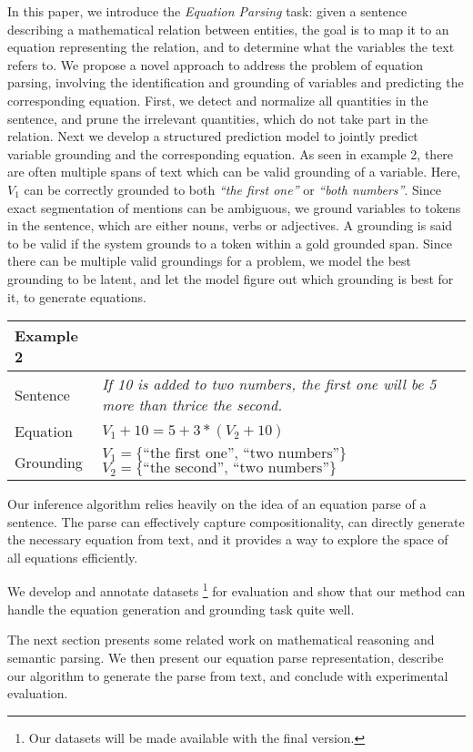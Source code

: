   In this paper, we introduce the {\em Equation Parsing} task: given a
  sentence describing a mathematical relation between entities, the
  goal is to map it to an equation representing the relation, and to
  determine what the variables the text refers to. We propose a novel
  approach to address the problem of equation parsing, involving the
  identification and grounding of variables and predicting the
  corresponding equation. First, we detect and normalize all
  quantities in the sentence, and prune the irrelevant quantities,
  which do not take part in the relation. Next we develop a structured
  prediction model to jointly predict variable grounding and the
  corresponding equation.  As seen in example 2, there are often
  multiple spans of text which can be valid grounding of a
  variable. Here, $V_1$ can be correctly grounded to both {\em``the
  first one''} or {\em``both numbers''}. Since exact segmentation of
  mentions can be ambiguous, we ground variables to tokens in the
  sentence, which are either nouns, verbs or adjectives. A grounding
  is said to be valid if the system grounds to a token within a gold
  grounded span.  Since there can be multiple valid groundings for a
  problem, we model the best grounding to be latent, and let the model
  figure out which grounding is best for it, to generate equations.
  
  
  \setlength{\tabcolsep}{6pt} 
  \begin{table} 
         \centering 
         \small 
         \begin{tabular}{|lp{5cm}|} \hline
         Example 2 & \\ \hline 
         Sentence & {\em If 10 is added to two numbers,
         the first one will be 5 more than thrice the second.} \\ \hline
         Equation & $V_1+10=5+3*(V_2+10)$\\ \hline 
         Grounding & $V_1= \{\text{``the first one'', ``two numbers''}\}$
         $V_2= \{\text{``the second'', ``two numbers''}\}$\\ 
        \hline 
        \end{tabular} 
        \label{tab:example2} 
  \end{table}
  
  
  Our inference algorithm relies heavily on the idea of an equation
  parse of a sentence. The parse can effectively capture
  compositionality, can directly generate the necessary equation from
  text, and it provides a way to explore the space of all equations
  efficiently.

  We develop and annotate datasets \footnote{Our datasets will be made
  available with the final version.} for evaluation and show that our
  method can handle the equation generation and grounding task quite
  well.

  The next section presents some related work on mathematical
  reasoning and semantic parsing. We then present our
  equation parse representation, describe our algorithm to generate
  the parse from text, and conclude with experimental evaluation.
  
